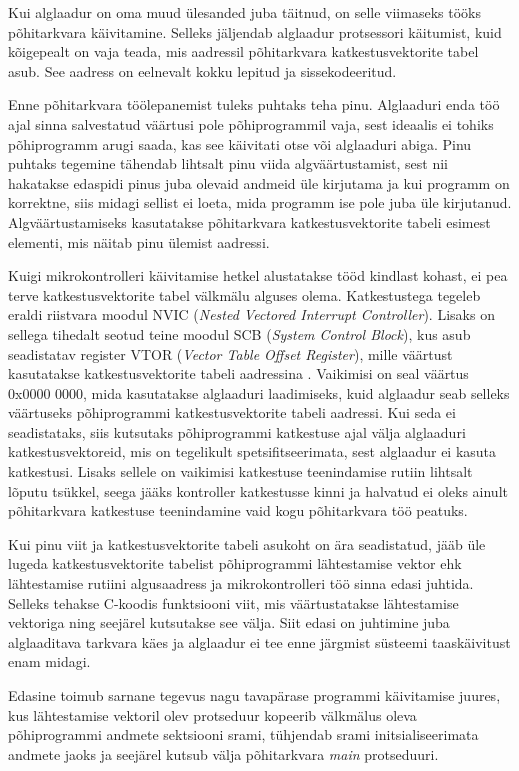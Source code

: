\documentclass[12pt,a4paper]{article}
\begin{document}
Kui alglaadur on oma muud ülesanded juba täitnud, on selle viimaseks tööks
põhitarkvara käivitamine. Selleks jäljendab alglaadur protsessori käitumist,
kuid kõigepealt on vaja teada, mis aadressil põhitarkvara katkestusvektorite
tabel asub. See aadress on eelnevalt kokku lepitud ja sissekodeeritud.

Enne põhitarkvara töölepanemist tuleks puhtaks teha pinu. Alglaaduri enda töö
ajal sinna salvestatud väärtusi pole põhiprogrammil vaja, sest
ideaalis ei tohiks põhiprogramm arugi saada, kas see käivitati otse või
alglaaduri abiga. Pinu puhtaks tegemine tähendab lihtsalt pinu viida
algväärtustamist, sest nii hakatakse edaspidi pinus juba olevaid andmeid üle
kirjutama ja kui programm on korrektne, siis midagi sellist ei loeta, mida
programm ise pole juba üle kirjutanud. Algväärtustamiseks kasutatakse
põhitarkvara katkestusvektorite tabeli esimest elementi, mis näitab pinu ülemist
aadressi.

Kuigi mikrokontrolleri käivitamise hetkel alustatakse tööd kindlast kohast, ei
pea terve katkestusvektorite tabel välkmälu alguses olema. Katkestustega tegeleb
eraldi riistvara moodul NVIC (\textit{Nested Vectored Interrupt Controller}).
Lisaks on sellega tihedalt seotud teine moodul SCB (\textit{System Control
Block}), kus asub seadistatav register VTOR (\textit{Vector Table Offset
Register}), mille väärtust kasutatakse katkestusvektorite tabeli aadressina
\cite{CM3pm}. Vaikimisi on seal väärtus 0x0000 0000, mida kasutatakse alglaaduri
laadimiseks, kuid alglaadur seab selleks väärtuseks põhiprogrammi
katkestusvektorite tabeli aadressi. Kui seda ei seadistataks, siis kutsutaks
põhiprogrammi katkestuse ajal välja alglaaduri katkestusvektoreid, mis on
tegelikult spetsifitseerimata, sest alglaadur ei kasuta katkestusi. Lisaks
sellele on vaikimisi katkestuse teenindamise rutiin lihtsalt lõputu tsükkel,
seega jääks kontroller katkestusse kinni ja halvatud ei oleks ainult
põhitarkvara katkestuse teenindamine vaid kogu põhitarkvara töö peatuks.

Kui pinu viit ja katkestusvektorite tabeli asukoht on ära seadistatud, jääb üle
lugeda katkestusvektorite tabelist põhiprogrammi lähtestamise vektor ehk
lähtestamise rutiini algusaadress ja mikrokontrolleri töö sinna edasi juhtida.
Selleks tehakse C-koodis funktsiooni viit, mis väärtustatakse lähtestamise
vektoriga ning seejärel kutsutakse see välja. Siit edasi on juhtimine juba
alglaaditava tarkvara käes ja alglaadur ei tee enne järgmist süsteemi
taaskäivitust enam midagi.

Edasine toimub sarnane tegevus nagu tavapärase programmi käivitamise juures, kus
lähtestamise vektoril olev protseduur kopeerib välkmälus oleva põhiprogrammi
andmete sektsiooni \gls{sram}i, tühjendab \gls{sram}i initsialiseerimata andmete
jaoks ja seejärel kutsub välja põhitarkvara \textit{main} protseduuri.
\end{document}
